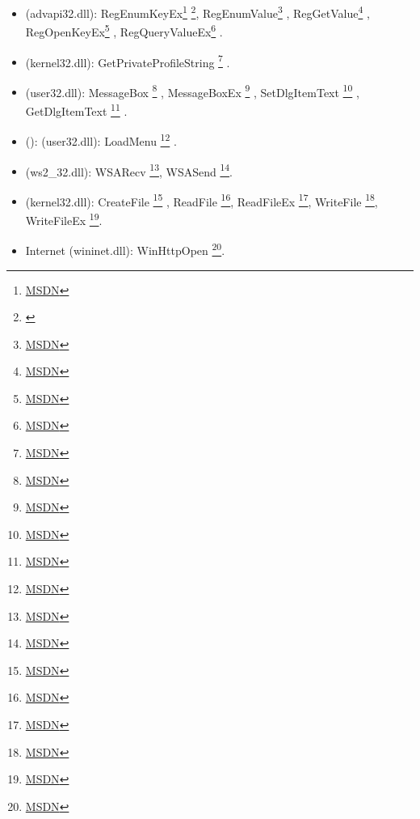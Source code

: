 \begin{itemize}

\item
{} (advapi32.dll): 
RegEnumKeyEx\footnote{\href{http://go.yurichev.com/17228}{MSDN}}
\footnote{
	\label{note1}},
RegEnumValue\footnote{\href{http://go.yurichev.com/17229}{MSDN}}
,
RegGetValue\footnote{\href{http://go.yurichev.com/17230}{MSDN}}
,
RegOpenKeyEx\footnote{\href{http://go.yurichev.com/17231}{MSDN}}
,
RegQueryValueEx\footnote{\href{http://go.yurichev.com/17232}{MSDN}}
.

\item
{} (kernel32.dll): 
GetPrivateProfileString
\footnote{\href{http://go.yurichev.com/17233}{MSDN}}
.

\item
{} (user32.dll): 
MessageBox
\footnote{\href{http://go.yurichev.com/17234}{MSDN}}
, 
MessageBoxEx
\footnote{\href{http://go.yurichev.com/17235}{MSDN}}
,
SetDlgItemText
\footnote{\href{http://go.yurichev.com/17236}{MSDN}}
,
GetDlgItemText
\footnote{\href{http://go.yurichev.com/17237}{MSDN}}
.

\item
{} (): (user32.dll):
LoadMenu
\footnote{\href{http://go.yurichev.com/17238}{MSDN}}
.
\item
{} (ws2\_32.dll):
WSARecv
\footnote{\href{http://go.yurichev.com/17239}{MSDN}},
WSASend
\footnote{\href{http://go.yurichev.com/17240}{MSDN}}.

\item
{} (kernel32.dll):
CreateFile
\footnote{\href{http://go.yurichev.com/17241}{MSDN}}
,
ReadFile
\footnote{\href{http://go.yurichev.com/17242}{MSDN}},
ReadFileEx
\footnote{\href{http://go.yurichev.com/17243}{MSDN}},
WriteFile
\footnote{\href{http://go.yurichev.com/17244}{MSDN}},
WriteFileEx
\footnote{\href{http://go.yurichev.com/17245}{MSDN}}.

\item
{} Internet
(wininet.dll):
WinHttpOpen
\footnote{\href{http://go.yurichev.com/17246}{MSDN}}.


\end{itemize}
